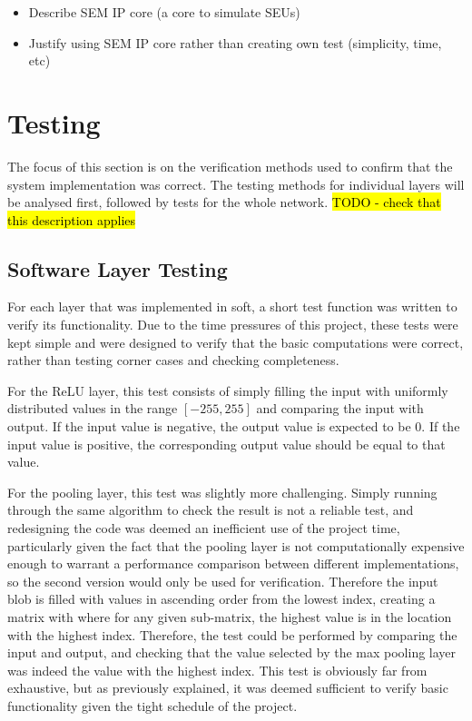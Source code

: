 \documentclass[12pt]{article}
\begin{document}
\begin{itemize}
\item Describe SEM IP core (a core to simulate SEUs)
\item Justify using SEM IP core rather than creating own test (simplicity, time, etc)
\end{itemize}

\newpage

\section{Testing}
\label{sec:Test}


The focus of this section is on the verification methods used to confirm that the system implementation was correct. The testing methods for individual layers will be analysed first, followed by tests for the whole network. \hl{TODO - check that this description applies}

\subsection{Software Layer Testing}
\label{sec:Test-Layers}

For each layer that was implemented in soft, a short test function was written to verify its functionality. Due to the time pressures of this project, these tests were kept simple and were designed to verify that the basic computations were correct, rather than testing corner cases and checking completeness.

For the ReLU layer, this test consists of simply filling the input with uniformly distributed values in the range $[-255, 255]$ and comparing the input with output. If the input value is negative, the output value is expected to be $0$. If the input value is positive, the corresponding output value should be equal to that value.

For the pooling layer, this test was slightly more challenging. Simply running through the same algorithm to check the result is not a reliable test, and redesigning the code was deemed an inefficient use of the project time, particularly given the fact that the pooling layer is not computationally expensive enough to warrant a performance comparison between different implementations, so the second version would only be used for verification. Therefore the input blob is filled with values in ascending order from the lowest index, creating a matrix with where for any given sub-matrix, the highest value is in the location with the highest index. Therefore, the test could be performed by comparing the input and output, and checking that the value selected by the max pooling layer was indeed the value with the highest index. This test is obviously far from exhaustive, but as previously explained, it was deemed sufficient to verify basic functionality given the tight schedule of the project.
\end{document}
